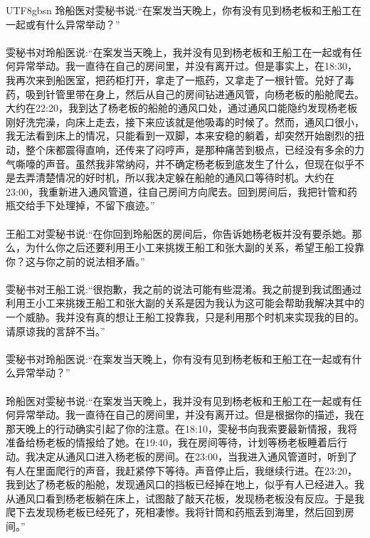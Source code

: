 \documentclass[11pt]{article}
\begin{document}
{\begin{CJK}{UTF8}{gbsn}
玲船医对雯秘书说:``在案发当天晚上，你有没有见到杨老板和王船工在一起或有什么异常举动？''\\ \\
雯秘书对玲船医说:``在案发当天晚上，我并没有见到杨老板和王船工在一起或有任何异常举动。我一直待在自己的房间里，并没有离开过。但是事实上，在18:30，我再次来到船医室，把药柜打开，拿走了一瓶药，又拿走了一根针管。兑好了毒药，吸到针管里带在身上，然后从自己的房间钻进通风管，向杨老板的船舱爬去。大约在22:20，我到达了杨老板的船舱的通风口处，通过通风口能隐约发现杨老板刚好洗完澡，向床上走去，接下来应该就是他吸毒的时候了。然而，通风口很小，我无法看到床上的情况，只能看到一双脚，本来安稳的躺着，却突然开始剧烈的扭动，整个床都震得直响，还传来了闷哼声，是那种痛苦到极点，已经没有多余的力气嘶嚎的声音。虽然我非常纳闷，并不确定杨老板到底发生了什么，但现在似乎不是去弄清楚情况的好时机，所以我决定躲在船舱的通风口等待时机。大约在23:00，我重新进入通风管道，往自己房间方向爬去。回到房间后，我把针管和药瓶交给手下处理掉，不留下痕迹。''\\ \\
王船工对雯秘书说:``在你回到玲船医的房间后，你告诉她杨老板并没有要杀她。那么，为什么你之后还要利用王小工来挑拨王船工和张大副的关系，希望王船工投靠你？这与你之前的说法相矛盾。''\\ \\
雯秘书对王船工说:``很抱歉，我之前的说法可能有些混淆。我之前提到我试图通过利用王小工来挑拨王船工和张大副的关系是因为我认为这可能会帮助我解决其中的一个威胁。我并没有真的想让王船工投靠我，只是利用那个时机来实现我的目的。请原谅我的言辞不当。''\\ \\
雯秘书对玲船医说:``在案发当天晚上，你有没有见到杨老板和王船工在一起或有什么异常举动？''\\ \\
玲船医对雯秘书说:``在案发当天晚上，我并没有见到杨老板和王船工在一起或有任何异常举动。我一直待在自己的房间里，并没有离开过。但是根据你的描述，我在那天晚上的行动确实引起了你的注意。在18:10，雯秘书向我索要最新情报，我将准备给杨老板的情报给了她。在19:40，我在房间等待，计划等杨老板睡着后行动。我决定从通风口进入杨老板的房间。在23:00，当我进入通风管道时，听到了有人在里面爬行的声音，我赶紧停下等待。声音停止后，我继续行进。在23:20，我到达了杨老板的船舱，发现通风口的挡板已经掉在地上，似乎有人已经进入。我从通风口看到杨老板躺在床上，试图敲了敲天花板，发现杨老板没有反应。于是我爬下去发现杨老板已经死了，死相凄惨。我将针筒和药瓶丢到海里，然后回到房间。''\\ \\


\end{CJK}}
\end{document}
